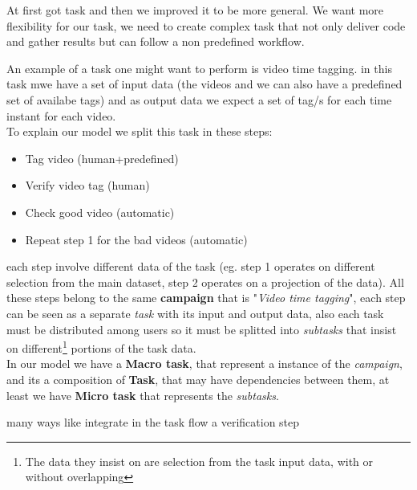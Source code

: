 
At first got task and then we improved it to be more general. We want more flexibility
for our task, we need to create complex task that not only deliver code and gather results but
can follow a non predefined workflow.

An example of a task one might want to perform is video time tagging. in this task mwe have a
set of input data (the videos and we can also have a predefined set of availabe tags) and
as output data we expect a set of tag/s for each time instant for each video.\\

To explain our model we split this task in these steps:
\begin{itemize}
	\item Tag video (human+predefined)
	\item Verify video tag (human)
	\item Check good video (automatic)
	\item Repeat step 1 for the bad videos (automatic)
\end{itemize}
each step involve different data of the task (eg. step 1 operates on different selection
from the main dataset, step 2 operates on a projection of the data). All these steps belong
to the same \textbf{campaign} that is "\emph{Video time tagging}", each step can be seen as
a separate \emph{task} with its input and output data, also each task must be distributed
among users so it must be splitted into \emph{subtasks} that insist on different\footnote{The
data they insist on are selection from the task input data, with or without overlapping}
portions of the task data.\\

In our model we have a \textbf{Macro task}, that represent a instance of the \emph{campaign},
and its a composition of \textbf{Task}, that may have dependencies between them, at least we
have \textbf{Micro task} that represents the \emph{subtasks}.


many ways like integrate in the task flow a verification step
